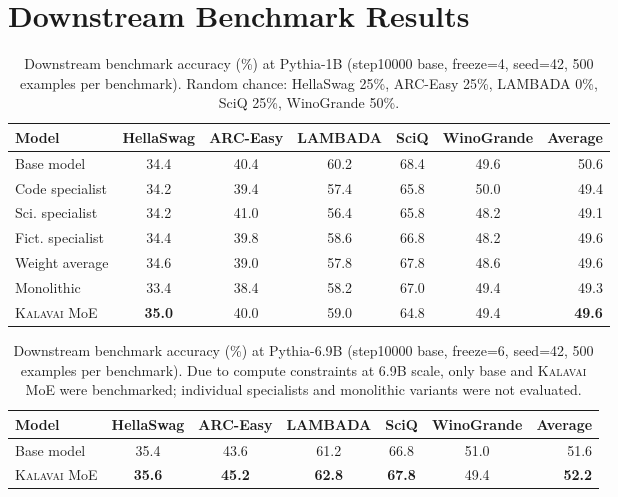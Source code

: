 \documentclass{article}
\newcommand{\kalavai}{\textsc{Kalavai}\xspace}
\begin{document}
\section{Downstream Benchmark Results}
\label{app:benchmarks}

\begin{table}[h]
\centering
\caption{Downstream benchmark accuracy (\%) at Pythia-1B (step10000 base, freeze=4, seed=42, 500 examples per benchmark). Random chance: HellaSwag 25\%, ARC-Easy 25\%, LAMBADA 0\%, SciQ 25\%, WinoGrande 50\%.}
\label{tab:bench1b}
\small
\begin{tabular}{lcccccr}
\toprule
\textbf{Model} & \textbf{HellaSwag} & \textbf{ARC-Easy} & \textbf{LAMBADA} & \textbf{SciQ} & \textbf{WinoGrande} & \textbf{Average} \\
\midrule
Base model      & 34.4 & 40.4 & 60.2 & 68.4 & 49.6 & 50.6 \\
Code specialist & 34.2 & 39.4 & 57.4 & 65.8 & 50.0 & 49.4 \\
Sci. specialist & 34.2 & 41.0 & 56.4 & 65.8 & 48.2 & 49.1 \\
Fict. specialist & 34.4 & 39.8 & 58.6 & 66.8 & 48.2 & 49.6 \\
Weight average  & 34.6 & 39.0 & 57.8 & 67.8 & 48.6 & 49.6 \\
Monolithic      & 33.4 & 38.4 & 58.2 & 67.0 & 49.4 & 49.3 \\
\kalavai MoE    & \textbf{35.0} & 40.0 & 59.0 & 64.8 & 49.4 & \textbf{49.6} \\
\bottomrule
\end{tabular}
\end{table}

\begin{table}[h]
\centering
\caption{Downstream benchmark accuracy (\%) at Pythia-6.9B (step10000 base, freeze=6, seed=42, 500 examples per benchmark). Due to compute constraints at 6.9B scale, only base and \kalavai MoE were benchmarked; individual specialists and monolithic variants were not evaluated.}
\label{tab:bench6b}
\small
\begin{tabular}{lcccccr}
\toprule
\textbf{Model} & \textbf{HellaSwag} & \textbf{ARC-Easy} & \textbf{LAMBADA} & \textbf{SciQ} & \textbf{WinoGrande} & \textbf{Average} \\
\midrule
Base model   & 35.4 & 43.6 & 61.2 & 66.8 & 51.0 & 51.6 \\
\kalavai MoE & \textbf{35.6} & \textbf{45.2} & \textbf{62.8} & \textbf{67.8} & 49.4 & \textbf{52.2} \\
\bottomrule
\end{tabular}
\end{table}
\end{document}
